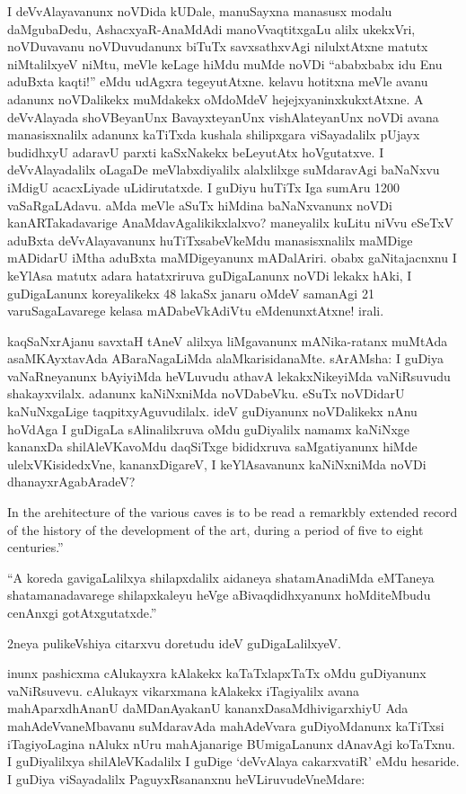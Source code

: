 \documentclass[11pt,a4size]{article}
\begin{document}
I deVvAlayavanunx noVDida kUDale, manuSayxna manasusx modalu
daMgubaDedu, AshacxyaR-AnaMdAdi manoVvaqtitxgaLu alilx ukekxVri,
noVDuvavanu noVDuvudanunx biTuTx savxsathxvAgi nilulxtAtxne matutx
niMtalilxyeV niMtu, meVle keLage hiMdu muMde noVDi ``ababxbabx idu Enu
aduBxta kaqti!'' eMdu udAgxra tegeyutAtxne. kelavu hotitxna meVle
avanu adanunx noVDalikekx muMdakekx oMdoMdeV hejejxyaninxkukxtAtxne. A
deVvAlayada shoVBeyanUnx BavayxteyanUnx vishAlateyanUnx noVDi avana
manasisxnalilx adanunx kaTiTxda kushala shilipxgara viSayadalilx
pUjayx budidhxyU adaravU parxti kaSxNakekx beLeyutAtx hoVgutatxve. I
deVvAlayadalilx oLagaDe meVlabxdiyalilx alalxlilxge suMdaravAgi
baNaNxvu iMdigU acacxLiyade uLidirutatxde. I guDiyu huTiTx Iga sumAru
1200 vaSaRgaLAdavu. aMda meVle aSuTx hiMdina baNaNxvanunx noVDi
kanARTakadavarige AnaMdavAgalikikxlalxvo? maneyalilx kuLitu niVvu
eSeTxV aduBxta deVvAlayavanunx huTiTxsabeVkeMdu manasisxnalilx maMDige
mADidarU iMtha aduBxta maMDigeyanunx mADalAriri. obabx gaNitajacnxnu I
keYlAsa matutx adara hatatxriruva guDigaLanunx noVDi lekakx hAki, I
guDigaLanunx koreyalikekx 48 lakaSx janaru oMdeV samanAgi 21
varuSagaLavarege kelasa mADabeVkAdiVtu eMdenunxtAtxne! irali.

kaqSaNxrAjanu savxtaH tAneV alilxya liMgavanunx mANika-ratanx muMtAda
asaMKAyxtavAda ABaraNagaLiMda alaMkarisidanaMte. sArAMsha: I guDiya
vaNaRneyanunx bAyiyiMda heVLuvudu athavA lekakxNikeyiMda vaNiRsuvudu
shakayxvilalx. adanunx kaNiNxniMda noVDabeVku. eSuTx noVDidarU
kaNuNxgaLige taqpitxyAguvudilalx. ideV guDiyanunx noVDalikekx nAnu
hoVdAga I guDigaLa sAlinalilxruva oMdu guDiyalilx namamx kaNiNxge
kananxDa shilAleVKavoMdu daqSiTxge bididxruva saMgatiyanunx hiMde
ulelxVKisidedxVne, kananxDigareV, I keYlAsavanunx kaNiNxniMda noVDi
dhanayxrAgabAradeV?

{
\rm

In the arehitecture of the various caves is to be read a remarkbly
extended record of the history of the development of the art, during a
period of five to eight centuries.''}

``A koreda gavigaLalilxya shilapxdalilx aidaneya shatamAnadiMda
eMTaneya shatamanadavarege shilapxkaleyu heVge aBivaqdidhxyanunx
hoMditeMbudu cenAnxgi gotAtxgutatxde.''

2neya pulikeVshiya citarxvu doretudu ideV guDigaLalilxyeV.

inunx pashicxma cAlukayxra kAlakekx kaTaTxlapxTaTx oMdu guDiyanunx
vaNiRsuvevu. cAlukayx vikarxmana kAlakekx iTagiyalilx avana
mahAparxdhAnanU daMDanAyakanU kananxDasaMdhivigarxhiyU Ada
mahAdeVvaneMbavanu suMdaravAda mahAdeVvara guDiyoMdanunx kaTiTxsi
iTagiyoLagina nAlukx nUru mahAjanarige BUmigaLanunx dAnavAgi
koTaTxnu. I guDiyalilxya shilAleVKadalilx I guDige `deVvAlaya
cakarxvatiR' eMdu hesaride. I guDiya viSayadalilx PaguyxRsananxnu
heVLiruvudeVneMdare:
\end{document}
